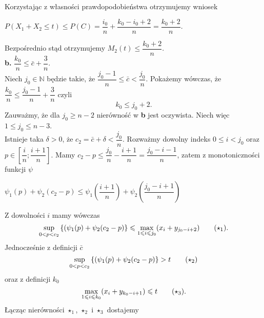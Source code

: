 \documentclass[12pt,a4paper,openany]{book}
\newcommand{\RomanNumeralCaps}[1]
    {\MakeUppercase{\romannumeral #1}}
\begin{document}
\noindent Korzystając z własności prawdopodobieństwa otrzymujemy wniosek
\begin{center}
$P(X_{1} + X_{2} \leqslant t) \leqslant P(C) = \dfrac{i_{0}}{n} + \dfrac{k_{0} - i_{0} + 2}{n} = \dfrac{k_{0} +2}{n}$.
\end{center}
Bezpośrednio stąd otrzymujemy  $M_{2}(t) \leqslant \dfrac{k_{0}+2}{n}$.\\
\noindent \textbf{\RomanNumeralCaps{2}b.} $\dfrac{k_{0}}{n} \leqslant \bar c + \dfrac{3}{n}$.\\
\noindent Niech $j_{0} \in \mathbb{N}$ będzie takie, że $\dfrac{j_{0} -1}{n} \leqslant \bar c < \dfrac{j_{0}}{n}$. Pokażemy wówczas, że $\dfrac{k_{0}}{n} \leqslant \dfrac{j_{0} -1}{n} + \dfrac{3}{n}$ czyli 
\begin{equation}
k_{0} \leqslant j_{0} +2 \tag{$\star$}.
\end{equation}
Zauważmy, że dla $j_{0} \geqslant n-2$ nierówność w \textbf{\RomanNumeralCaps{2}b} jest oczywista. Niech więc $1 \leqslant j_{0} \leqslant n-3$.\\
\noindent Istnieje taka $\delta > 0$, że $c_{2} = \bar c + \delta < \dfrac{j_{0}}{n}$. Rozważmy dowolny indeks $0 \leqslant i < j_{0}$ oraz $p \in \left[ \dfrac{i}{n}; \dfrac{i+1}{n} \right]$. Mamy $c_{2} - p \leqslant  \dfrac{j_{0}}{n} - \dfrac{i+1}{n} = \dfrac{j_{0} -i -1}{n}$, zatem z monotoniczności funkcji $\psi$
\begin{center}
$\psi_{1}(p) + \psi_{2}(c_{2} - p) \leqslant \psi_{1}\left( \dfrac{i+1}{n} \right)  + \psi_{2}\left( \dfrac{j_{0} -i +1}{n} \right)$
\end{center}
\noindent Z dowolności $i$ mamy wówczas
\begin{equation}
\underset{0 < p < c_{2}}{\textnormal{sup}}\left\lbrace (\psi_{1}(p) + \psi_{2}(c_{2} - p) \right\rbrace \leqslant \underset{1 \leqslant i \leqslant j_{0}}{\textnormal{max}}(x_{i} + y_{j_{0} - i + 2}) \tag{$\star_{1}$}.
\end{equation}
Jednocześnie z definicji $\bar c$
\begin{equation}
\underset{0 < p < c_{2}}{\textnormal{sup}}\left\lbrace (\psi_{1}(p) + \psi_{2}(c_{2} - p) \right\rbrace > t \tag{$\star_{2}$}
\end{equation}
oraz z definicji $k_{0}$
\begin{equation}
\underset{1 \leqslant i \leqslant k_{0}}{\textnormal{max}}(x_{i} + y_{k_{0} - i + 1}) \leqslant t\tag{$\star_{3}$}.
\end{equation}
Łącząc nierówności $\star_{1}$, $\star_{2}$ i $\star_{3}$ dostajemy
\end{document}

